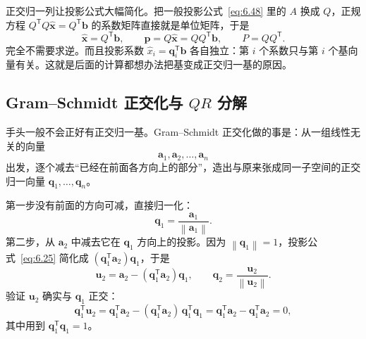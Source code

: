 \documentclass[UTF8,a4paper,12pt]{ctexart}
\numberwithin{equation}{section}
\newcommand{\norm}[1]{\left\lVert #1 \right\rVert}
\newcommand{\trans}{^{\mathsf T}}
\begin{document}
正交归一列让投影公式大幅简化。把一般投影公式~\eqref{eq:6.48} 里的 $A$ 换成 $Q$，正规方程 $Q\trans Q\hat{\bm{x}}=Q\trans\bm{b}$ 的系数矩阵直接就是单位矩阵，于是
	\begin{equation}\label{eq:6.78}
	\hat{\bm{x}}=Q\trans\bm{b},
	\qquad
	\bm{p}=Q\hat{\bm{x}}=QQ\trans\bm{b},
	\qquad
	P=QQ\trans.
	\end{equation}
	完全不需要求逆。而且投影系数 $\hat{x}_i=\bm{q}_i\trans\bm{b}$ 各自独立：第 $i$ 个系数只与第 $i$ 个基向量有关。这就是后面的计算都想办法把基变成正交归一基的原因。

	\subsection{Gram--Schmidt 正交化与 \texorpdfstring{$QR$}{QR} 分解}

	手头一般不会正好有正交归一基。Gram--Schmidt 正交化做的事是：从一组线性无关的向量
	\begin{equation}\label{eq:6.79}
	\bm{a}_1,\bm{a}_2,\ldots,\bm{a}_n
	\end{equation}
	出发，逐个减去“已经在前面各方向上的部分”，造出与原来张成同一子空间的正交归一向量 $\bm{q}_1,\ldots,\bm{q}_n$。

	第一步没有前面的方向可减，直接归一化：
	\begin{equation}\label{eq:6.80}
	\bm{q}_1
	=
	\frac{\bm{a}_1}{\norm{\bm{a}_1}}.
	\end{equation}
第二步，从 $\bm{a}_2$ 中减去它在 $\bm{q}_1$ 方向上的投影。因为 $\norm{\bm{q}_1}=1$，投影公式~\eqref{eq:6.25} 简化成 $(\bm{q}_1\trans\bm{a}_2)\bm{q}_1$，于是
	\begin{equation}\label{eq:6.81}
	\bm{u}_2
	=
	\bm{a}_2
	-(\bm{q}_1\trans\bm{a}_2)\bm{q}_1,
	\qquad
	\bm{q}_2
	=
	\frac{\bm{u}_2}{\norm{\bm{u}_2}}.
	\end{equation}
	验证 $\bm{u}_2$ 确实与 $\bm{q}_1$ 正交：
	\begin{equation}\label{eq:6.82}
	\bm{q}_1\trans\bm{u}_2
	=\bm{q}_1\trans\bm{a}_2-(\bm{q}_1\trans\bm{a}_2)\,\bm{q}_1\trans\bm{q}_1
	=\bm{q}_1\trans\bm{a}_2-\bm{q}_1\trans\bm{a}_2
	=0,
	\end{equation}
	其中用到 $\bm{q}_1\trans\bm{q}_1=1$。
\end{document}
